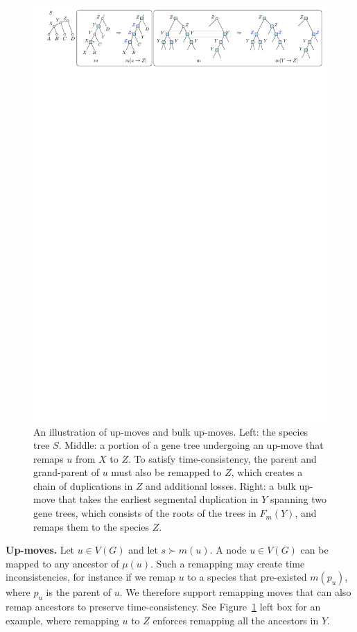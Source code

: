 \documentclass[10pt]{article}
\begin{document}
\begin{figure}
    \centering
    \includegraphics[width=1\linewidth]{figs_theory/upmoves.pdf}
    \caption{An illustration of up-moves and bulk up-moves.  Left: the species tree $S$.  Middle: a portion of a gene tree undergoing an up-move that remaps $u$ from $X$ to $Z$.  To satisfy time-consistency, the parent and grand-parent of $u$ must also be remapped to $Z$, which creates a chain of duplications in $Z$ and additional losses.  Right: a bulk up-move that takes the earliest segmental duplication in $Y$ spanning two gene trees, which consists of the roots of the trees in $F_m(Y)$, and remaps them to the species $Z$.}
    \label{fig:up-moves}
\end{figure}

\medskip 

\noindent 
\textbf{Up-moves.}
Let $u \in V(G)$ and let $s \succ m(u)$.
A node $u \in V(G)$ can be mapped to any ancestor of $\mu(u)$.  Such a remapping may create time inconsistencies, for instance if we remap $u$ to a species that pre-existed $m(p_u)$, where $p_u$ is the parent of $u$.  We therefore support remapping moves that can also remap ancestors to preserve time-consistency.  See Figure~\ref{fig:up-moves} left box for an example, where remapping $u$ to $Z$ enforces remapping all the ancestors in $Y$.
\end{document}
